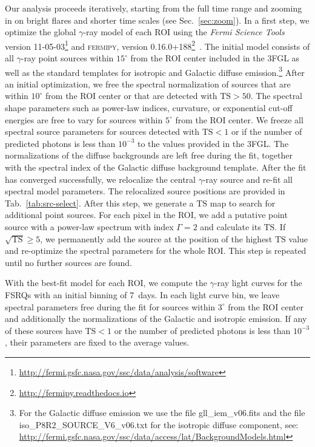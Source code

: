 \documentclass[twocolumn,linenumbers]{aastex62}
\newcommand{\gray}{$\gamma$-ray\xspace}
\begin{document}
Our analysis proceeds iteratively, starting from the full time range and zooming in on bright flares and shorter time scales (see Sec.~\ref{sec:zoom}).
In a first step, we optimize the global \gray model of each ROI using the \textit{Fermi Science Tools} version 11-05-03\footnote{\url{http://fermi.gsfc.nasa.gov/ssc/data/analysis/software}} and \textsc{fermipy}, version 0.16.0+188\footnote{\url{http://fermipy.readthedocs.io}}~\citep{fermipy}.
The initial model consists of all \gray point sources within $15^\circ$ from the ROI center included in the 3FGL as well as the standard templates for isotropic and Galactic diffuse emission.\footnote{For the Galactic diffuse emission we use the file gll\_iem\_v06.fits and the file iso\_P8R2\_SOURCE\_V6\_v06.txt for the isotropic diffuse component, see: \url{ http://fermi.gsfc.nasa.gov/ssc/data/access/lat/BackgroundModels.html}}
After an initial optimization, we free the spectral normalization of sources that are within $10^\circ$ from the ROI center or that are detected with $\mathrm{TS} > 50$.
The spectral shape parameters such as power-law indices, curvature, or exponential cut-off energies are free to vary for sources within $5^\circ$ from the ROI center. 
We freeze all spectral source parameters for sources detected with $\mathrm{TS} < 1$ or if the number of predicted photons is less than $10^{-3}$ to the values provided in the 3FGL. 
The normalizations of the diffuse backgrounds are left free during the fit, together with the spectral index of the Galactic diffuse background template.
After the fit has converged successfully, 
we relocalize the central \gray source and re-fit all spectral model parameters. The relocalized source positions are provided in Tab.~\ref{tab:src-select}.
After this step, we generate a $\mathrm{TS}$ map to search for additional point sources. For each pixel in the ROI, we add a putative point source with a power-law spectrum with index $\Gamma = 2$ and calculate its $\mathrm{TS}$. If  $\sqrt{\mathrm{TS}} \geqslant 5$, we permanently add the source at the position of the highest $\mathrm{TS}$ value and re-optimize the spectral parameters for the whole ROI. This step is repeated until no further sources are found.

With the best-fit model for each ROI, we compute the \gray light curves for the FSRQs with an initial binning of 7~days. 
In each light curve bin, we leave spectral parameters free during the fit for sources within $3^\circ$ from the ROI center and additionally the normalizations of the Galactic and isotropic emission. If any of these sources have $\mathrm{TS} < 1$ or the number of predicted photons is less than $10^{-3}$, their parameters are fixed to the average values.
\end{document}
